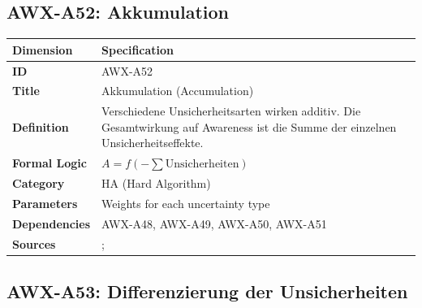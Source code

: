 
\subsection{AWX-A52: Akkumulation}

\begin{table}[htbp]
\small
\begin{tabular}{p{3cm}p{11cm}}
\toprule
\textbf{Dimension} & \textbf{Specification} \\
\midrule
\textbf{ID} & AWX-A52 \\
\textbf{Title} & Akkumulation (Accumulation) \\
\textbf{Definition} & Verschiedene Unsicherheitsarten wirken additiv. Die Gesamtwirkung auf Awareness ist die Summe der einzelnen Unsicherheitseffekte. \\
\textbf{Formal Logic} & $A = f(-\sum \text{Unsicherheiten})$ \\
\textbf{Category} & HA (Hard Algorithm) \\
\textbf{Parameters} & Weights for each uncertainty type \\
\textbf{Dependencies} & AWX-A48, AWX-A49, AWX-A50, AWX-A51 \\
\textbf{Sources} & \citet{camerer1992recent}; \citet{ellsberg1961risk} \\
\bottomrule
\end{tabular}
\end{table}


\subsection{AWX-A53: Differenzierung der Unsicherheiten}

